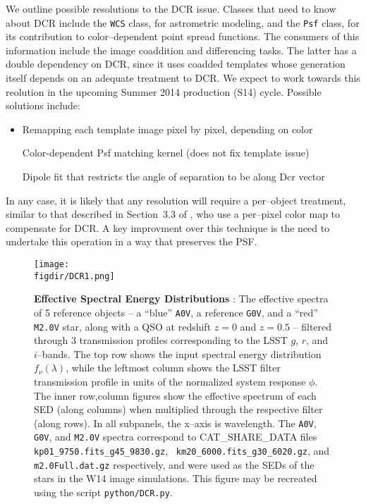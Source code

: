 \documentclass[prd, nofootinbib, floatfix, 11pt, tightenlines, times]{article}
\def\figdir{../figures}
\begin{document}
We outline possible resolutions to the DCR issue.  Classes that need
to know about DCR include the {\tt WCS} class, for astrometric
modeling, and the {\tt Psf} class, for its contribution to
color--dependent point spread functions.  The consumers of this
information include the image coaddition and differencing tasks.  The
latter has a double dependency on DCR, since it uses coadded
templates whose generation itself depends on an adequate treatment to
DCR.  We expect to work towards this reolution in the upcoming Summer
2014 production (S14) cycle.  Possible solutions include:

\begin{itemize}
\item

Remapping each template image pixel by pixel, depending on color

Color-dependent Psf matching kernel (does not fix template issue)

Dipole fit that restricts the angle of separation to be along Dcr vector

\end{itemize}

In any case, it is likely that any resolution will require a
per--object treatment, similar to that described in Section~3.3 of
\cite{1999ApJ...521..602A}, who use a per--pixel color map to
compensate for DCR.  A key improvment over this technique is the need
to undertake this operation in a way that preserves the PSF.


\clearpage
\begin{figure}[h!]
  \centering
  \texttt{[image: \\figdir/DCR1.png]}
  \caption{{\bf Effective Spectral Energy Distributions} : The
    effective spectra of 5 reference objects -- a ``blue'' {\tt A0V},
    a reference {\tt G0V}, and a ``red'' {\tt M2.0V} star, along with
    a QSO at redshift $z=0$ and $z=0.5$ -- filtered through 3
    transmission profiles corresponding to the LSST $g$, $r$, and
    $i$--bands.  The top row shows the input spectral energy
    distribution $f_\nu(\lambda)$, while the leftmost column shows the
    LSST filter transmission profile in units of the normalized
    system response $\phi$.  The inner row,column figures show the
    effective spectrum of each SED (along columns) when multiplied
    through the respective filter (along rows).  In all subpanels, the
    x--axis is wavelength.  The {\tt A0V}, {\tt G0V}, and {\tt M2.0V}
    spectra correspond to {CAT\_SHARE\_DATA} files {\tt
      kp01\_9750.fits\_g45\_9830.gz}, {\tt
      km20\_6000.fits\_g30\_6020.gz}, and {\tt m2.0Full.dat.gz}
    respectively, and were used as the SEDs of the stars in the W14
    image simulations.  This figure may be recreated using the script
    {\tt python/DCR.py}.}
  \label{fig:spectra}
\end{figure}
\end{document}
